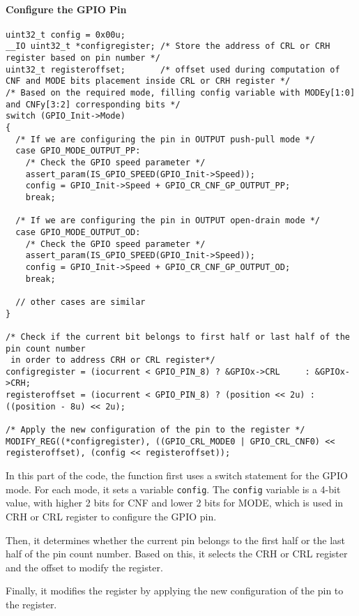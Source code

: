 \documentclass[a4paper,12pt]{article}
\begin{document}
\paragraph{Configure the GPIO Pin}

\begin{verbatim}
uint32_t config = 0x00u;
__IO uint32_t *configregister; /* Store the address of CRL or CRH register based on pin number */
uint32_t registeroffset;       /* offset used during computation of CNF and MODE bits placement inside CRL or CRH register */
/* Based on the required mode, filling config variable with MODEy[1:0] and CNFy[3:2] corresponding bits */
switch (GPIO_Init->Mode)
{
  /* If we are configuring the pin in OUTPUT push-pull mode */
  case GPIO_MODE_OUTPUT_PP:
    /* Check the GPIO speed parameter */
    assert_param(IS_GPIO_SPEED(GPIO_Init->Speed));
    config = GPIO_Init->Speed + GPIO_CR_CNF_GP_OUTPUT_PP;
    break;

  /* If we are configuring the pin in OUTPUT open-drain mode */
  case GPIO_MODE_OUTPUT_OD:
    /* Check the GPIO speed parameter */
    assert_param(IS_GPIO_SPEED(GPIO_Init->Speed));
    config = GPIO_Init->Speed + GPIO_CR_CNF_GP_OUTPUT_OD;
    break;

  // other cases are similar
}

/* Check if the current bit belongs to first half or last half of the pin count number
 in order to address CRH or CRL register*/
configregister = (iocurrent < GPIO_PIN_8) ? &GPIOx->CRL     : &GPIOx->CRH;
registeroffset = (iocurrent < GPIO_PIN_8) ? (position << 2u) : ((position - 8u) << 2u);

/* Apply the new configuration of the pin to the register */
MODIFY_REG((*configregister), ((GPIO_CRL_MODE0 | GPIO_CRL_CNF0) << registeroffset), (config << registeroffset));
\end{verbatim}

In this part of the code, the function first uses a switch statement for the GPIO mode. For each mode, it sets a variable \texttt{config}. The \texttt{config} variable is a 4-bit value, with higher 2 bits for CNF and lower 2 bits for MODE, which is used in CRH or CRL register to configure the GPIO pin.

Then, it determines whether the current pin belongs to the first half or the last half of the pin count number. Based on this, it selects the CRH or CRL register and the offset to modify the register.

Finally, it modifies the register by applying the new configuration of the pin to the register.
\end{document}
